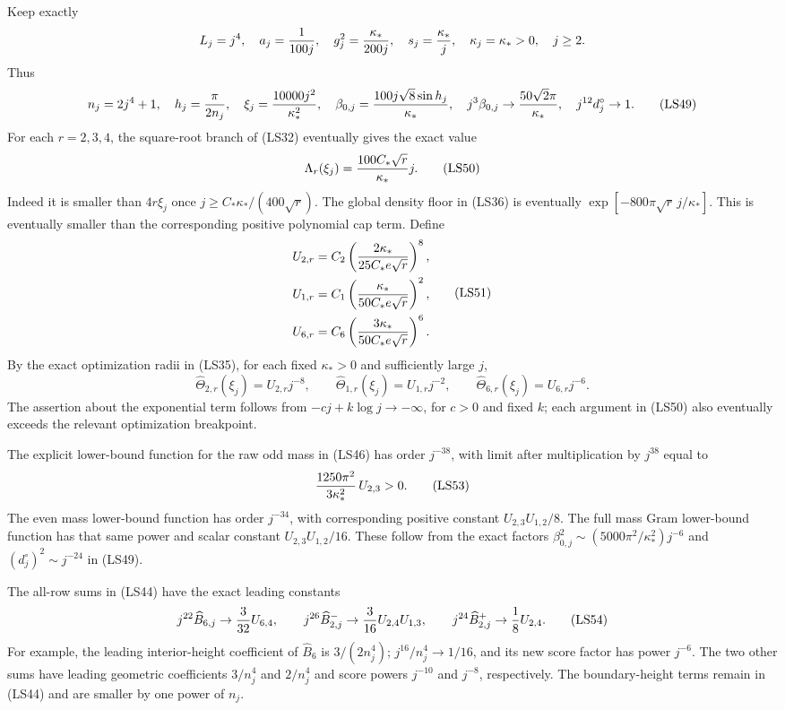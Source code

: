 \documentclass[11pt]{article}
\begin{document}
Keep exactly
\[
 L_j=j^4,\quad a_j={1\over100j},\quad
 g_j^2={\kappa_*\over200j},\quad s_j={\kappa_*\over j},\quad
 \kappa_j=\kappa_*>0,\quad j\ge2.
 \]
Thus
\[
 n_j=2j^4+1,\quad h_j={\pi\over2n_j},\quad
 \xi_j={10000j^2\over\kappa_*^2},\quad
 \beta_{0,j}={100j\sqrt8\sin h_j\over\kappa_*},\quad
 j^3\beta_{0,j}\to{50\sqrt2\pi\over\kappa_*},\quad
 j^{12}d_j^\circ\to1.
 \tag{LS49}
\]
For each \(r=2,3,4\), the square-root branch of (LS32)
eventually gives the exact value
\[
 \Lambda_r(\xi_j)={100C_*\sqrt r\over\kappa_*}j.
 \tag{LS50}
\]
Indeed it is smaller than \(4r\xi_j\) once
\(j\ge C_*\kappa_*/(400\sqrt r)\).
The global density floor in (LS36) is eventually
\(\exp[-800\pi\sqrt r\,j/\kappa_*]\).
This is eventually smaller than the corresponding positive
polynomial cap term. Define
\[
 \begin{aligned}
 U_{2,r}&=C_2\left({2\kappa_*\over25C_*e\sqrt r}\right)^8,\\
 U_{1,r}&=C_1\left({\kappa_*\over50C_*e\sqrt r}\right)^2,\\
 U_{6,r}&=C_6\left({3\kappa_*\over50C_*e\sqrt r}\right)^6.
 \end{aligned}
 \tag{LS51}
\]
By the exact optimization radii in (LS35), for each fixed
\(\kappa_*>0\) and sufficiently large \(j\),
\[
 \widehat\Theta_{2,r}(\xi_j)=U_{2,r}j^{-8},\qquad
 \widehat\Theta_{1,r}(\xi_j)=U_{1,r}j^{-2},\qquad
 \widehat\Theta_{6,r}(\xi_j)=U_{6,r}j^{-6}.
 \tag{LS52}
\]
The assertion about the exponential term follows from
\(-cj+k\log j\to-\infty\), for \(c>0\) and fixed \(k\);
each argument in (LS50) also eventually exceeds the relevant
optimization breakpoint.

The explicit lower-bound function for the raw odd mass in (LS46)
has order \(j^{-38}\), with limit after multiplication by
\(j^{38}\) equal to
\[
 {1250\pi^2\over3\kappa_*^2}\,U_{2,3}>0.
 \tag{LS53}
\]
The even mass lower-bound function has order \(j^{-34}\), with
corresponding positive constant \(U_{2,3}U_{1,2}/8\).
The full mass Gram lower-bound function has that same power and
scalar constant \(U_{2,3}U_{1,2}/16\).
These follow from the exact factors
\(\beta_{0,j}^2\sim(5000\pi^2/\kappa_*^2)j^{-6}\) and
\((d_j^\circ)^2\sim j^{-24}\) in (LS49).

The all-row sums in (LS44) have the exact leading constants
\[
 j^{22}\widehat B_{6,j}\to {3\over32}U_{6,4},\qquad
 j^{26}\widehat B_{2,j}^-\to {3\over16}U_{2,4}U_{1,3},\qquad
 j^{24}\widehat B_{2,j}^+\to {1\over8}U_{2,4}.
 \tag{LS54}
\]
For example, the leading interior-height coefficient of
\(\widehat B_6\) is \(3/(2n_j^4)\);
\(j^{16}/n_j^4\to1/16\), and its new score factor has power
\(j^{-6}\). The two other sums have leading geometric
coefficients \(3/n_j^4\) and \(2/n_j^4\) and score powers
\(j^{-10}\) and \(j^{-8}\), respectively. The boundary-height
terms remain in (LS44) and are smaller by one power of \(n_j\).
\end{document}
